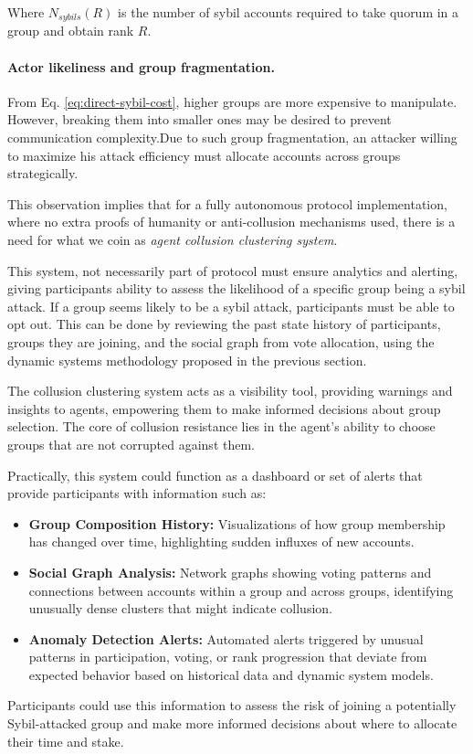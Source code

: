 \documentclass{article}
\begin{document}
\begin{CJK}{UTF8}{gbsn}
    Where $N_{sybils}(R)$ is the number of sybil accounts required to take quorum in a group and obtain rank $R$.
    \paragraph{Actor likeliness and group fragmentation.}
    From Eq. \ref{eq:direct-sybil-cost}, higher groups are more expensive to manipulate. However, breaking them into smaller ones may be desired to prevent communication complexity.Due to such group fragmentation, an attacker willing to maximize his attack efficiency must allocate accounts across groups strategically.

    This observation implies that for a fully autonomous protocol implementation, where no extra proofs of humanity or anti-collusion mechanisms used, there is a need for what we coin as \textit{agent collusion clustering system}.

    This system, not necessarily part of protocol must ensure analytics and alerting, giving participants ability to assess the likelihood of a specific group being a sybil attack. If a group seems likely to be a sybil attack, participants must be able to opt out. This can be done by reviewing the past state history of participants, groups they are joining, and the social graph from vote allocation, using the dynamic systems methodology proposed in the previous section.

    The collusion clustering system acts as a visibility tool, providing warnings and insights to agents, empowering them to make informed decisions about group selection. The core of collusion resistance lies in the agent's ability to choose groups that are not corrupted against them.

        {{  Practically, this system could function as a dashboard or set of alerts that provide participants with information such as: }}
    \begin{itemize}
        \item \textbf{Group Composition History:} Visualizations of how group membership has changed over time, highlighting sudden influxes of new accounts.
        \item \textbf{Social Graph Analysis:}  Network graphs showing voting patterns and connections between accounts within a group and across groups, identifying unusually dense clusters that might indicate collusion.
        \item \textbf{Anomaly Detection Alerts:}  Automated alerts triggered by unusual patterns in participation, voting, or rank progression that deviate from expected behavior based on historical data and dynamic system models.
    \end{itemize}
    {{ Participants could use this information to assess the risk of joining a potentially Sybil-attacked group and make more informed decisions about where to allocate their time and stake. }}


\end{CJK}
\end{document}
